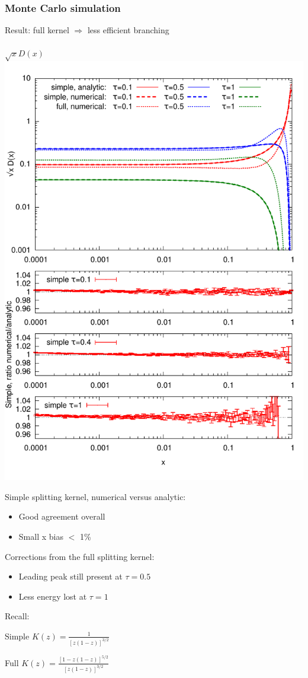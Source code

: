 \documentclass[pstricks,mathserif]{beamer}
\begin{document}
\begin{frame}
\frametitle{Monte Carlo simulation}

Result: full kernel $\Rightarrow$ less efficient branching\\
~\\



\centering
\small $\sqrt{x} D(x)$
\includegraphics[width=1\linewidth]{times.pdf}
\endminipage\hfill
{}
\small 

Simple splitting kernel, numerical versus analytic:
\begin{itemize}
\item Good agreement overall
\item Small x bias $<$ 1\%
\end{itemize}

Corrections from the full splitting kernel:
\begin{itemize}
\item Leading peak still present at $\tau=0.5$
\item Less energy lost at $\tau=1$
\end{itemize}


Recall:

Simple $K(z)=\frac{1}{[z(1-z)]^{3/2}}$


Full $K(z)=\frac{[1-z(1-z)]^{5/2}}{[z(1-z)]^{3/2}}$


\endminipage\hfill


\end{frame}
\end{document}
